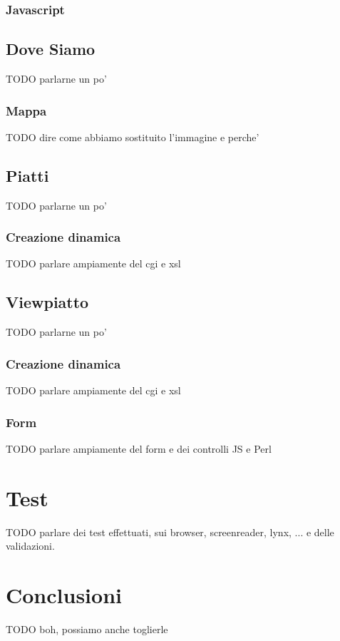 \documentclass[10pt,a4paper,onecolumn]{article}
\begin{document}
\subsubsection{Javascript}

\subsection{Dove Siamo}

TODO parlarne un po'

\subsubsection{Mappa}

TODO dire come abbiamo sostituito l'immagine e perche'

\subsection{Piatti}

TODO parlarne un po'

\subsubsection{Creazione dinamica}

TODO parlare ampiamente del cgi e xsl

\subsection{Viewpiatto}

TODO parlarne un po'

\subsubsection{Creazione dinamica}

TODO parlare ampiamente del cgi e xsl

\subsubsection{Form}

TODO parlare ampiamente del form e dei controlli JS e Perl

\clearpage

\section{Test}

TODO parlare dei test effettuati, sui browser, screenreader, lynx, ... e delle validazioni.

\section{Conclusioni}

TODO boh, possiamo anche toglierle
\end{document}
